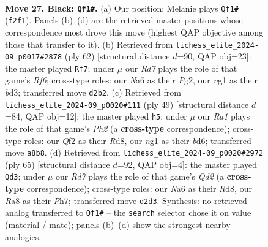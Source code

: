\documentclass[11pt]{article}
\begin{document}
\clearpage

\begin{figure}[p]\centering
\begin{subfigure}{0.46\textwidth}\centering
\resizebox{\linewidth}{!}{%
\newchessgame
\chessboard[
  setfen={r1b2k2/pp3pp1/n3p3/3p4/8/PP6/3r1qPP/RK4NR b - - 1 27},
  showmover=false,
  pgfstyle=straightmove, color=movearrow, markmove={f2-f1}
]}
\caption{}
\end{subfigure}\hfill
\begin{subfigure}{0.46\textwidth}\centering
\resizebox{\linewidth}{!}{%
\newchessgame
\chessboard[
  setfen={r5k1/p5n1/2pN1R2/2P4r/7p/P1Qb4/1P4PP/6K1 w - - 3 32},
  showmover=false,
  pgfstyle=straightmove, color=movearrow, markmove={f6-f7}
]}
\caption{}
\end{subfigure}
\\[4pt]
\begin{subfigure}{0.46\textwidth}\centering
\resizebox{\linewidth}{!}{%
\newchessgame
\chessboard[
  setfen={3r3k/1p3rpp/p1pB1p2/5b2/8/7P/P4PP1/2R1R1K1 b - - 0 25},
  showmover=false,
  pgfstyle=straightmove, color=movearrow, markmove={h7-h5}
]}
\caption{}
\end{subfigure}\hfill
\begin{subfigure}{0.46\textwidth}\centering
\resizebox{\linewidth}{!}{%
\newchessgame
\chessboard[
  setfen={3r2k1/1p1q2pp/2b2p2/4p3/p3P3/2B3PP/4QP2/2R3K1 b - - 2 33},
  showmover=false,
  pgfstyle=straightmove, color=movearrow, markmove={d7-d3}
]}
\caption{}
\end{subfigure}
\caption{\textbf{Move 27, Black: \texttt{Qf1\#}.} (a) Our position; Melanie plays \texttt{Qf1\#} (\texttt{f2f1}). Panels (b)--(d) are the retrieved master positions whose correspondence most drove this move (highest QAP objective among those that transfer to it). (b) Retrieved from \texttt{lichess\_elite\_2024-09\_p0017\#2878} (ply 62) [structural distance $d$=90, QAP obj=23]: the master played \texttt{Rf7}; under $\mu$ our \emph{Rd7} plays the role of that game's \emph{Rf6}; cross-type roles: our \emph{N}a6 as their \emph{P}g2, our \emph{n}g1 as their \emph{b}d3; transferred move \texttt{d2b2}. (c) Retrieved from \texttt{lichess\_elite\_2024-09\_p0020\#111} (ply 49) [structural distance $d$=84, QAP obj=12]: the master played \texttt{h5}; under $\mu$ our \emph{Ra1} plays the role of that game's \emph{Ph2} (a \textbf{cross-type} correspondence); cross-type roles: our \emph{Q}f2 as their \emph{R}d8, our \emph{n}g1 as their \emph{b}d6; transferred move \texttt{a8b8}. (d) Retrieved from \texttt{lichess\_elite\_2024-09\_p0020\#2972} (ply 65) [structural distance $d$=92, QAP obj=4]: the master played \texttt{Qd3}; under $\mu$ our \emph{Rd7} plays the role of that game's \emph{Qd2} (a \textbf{cross-type} correspondence); cross-type roles: our \emph{N}a6 as their \emph{R}d8, our \emph{R}a8 as their \emph{P}h7; transferred move \texttt{d2d3}. Synthesis: no retrieved analog transferred to \texttt{Qf1\#} -- the \texttt{search} selector chose it on value (material / mate); panels (b)--(d) show the strongest nearby analogies.}
\label{fig:thought-m53}
\end{figure}
\end{document}
